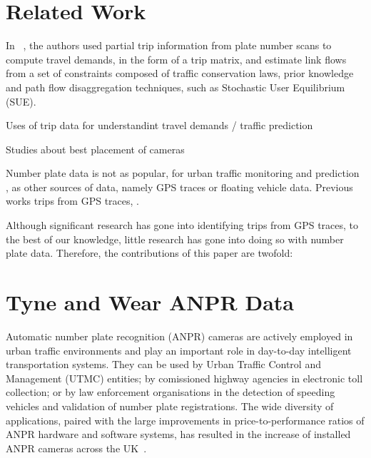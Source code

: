 \section{Related Work}
\label{s.related}


In ~\cite{Castillo2008}, the authors used partial trip information from plate number scans to compute travel demands, in the form of a trip matrix, and estimate link flows from a set of constraints composed of traffic conservation laws, prior knowledge and path flow disaggregation techniques, such as Stochastic User Equilibrium (SUE).


Uses of trip data for understandint travel demands / traffic prediction

Studies about best placement of cameras

Number plate data is not as popular, for urban traffic monitoring and prediction , as other sources of data, namely GPS traces or floating vehicle data.
Previous works trips from GPS traces, .

Although significant research has gone into identifying trips from GPS traces, to the best of our knowledge, little research has gone into doing so with number plate data. Therefore, the contributions of this paper are twofold:


\section{Tyne and Wear ANPR Data}
\label{s.ncl}
Automatic number plate recognition (ANPR) cameras are actively employed in urban traffic environments and play an important role in day-to-day intelligent transportation systems. They can be used by Urban Traffic Control and Management (UTMC) entities; by comissioned highway agencies in electronic toll collection; or by law enforcement organisations in the detection of speeding vehicles and validation of number plate registrations. The wide diversity of applications, paired with the large improvements in price-to-performance ratios of ANPR hardware and software systems, has resulted in the increase of installed ANPR cameras across the UK~\cite{EvolutionUTMC2013, SurveyITS2011}.

